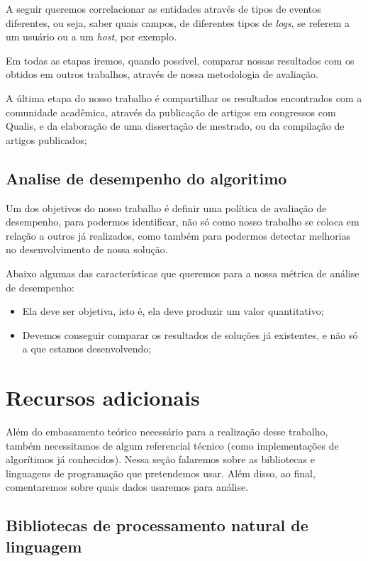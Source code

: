 \documentclass[
	12pt,				%
	openright,			%
	twoside,			%
	a4paper,			%
	english,			%
	spanish,			%
	brazil,				%
	]{abntex2}
\begin{document}
A seguir queremos correlacionar as entidades através de tipos de eventos diferentes, ou seja, saber quais campos, de diferentes tipos de \emph{logs}, se referem a um usuário ou a um \emph{host}, por exemplo.

Em todas as etapas iremos, quando possível, comparar nossas resultados com os obtidos em outros trabalhos, através de nossa metodologia de avaliação.

A última etapa do nosso trabalho é compartilhar os resultados encontrados com a comunidade acadêmica, através da publicação de artigos em congressos com Qualis, e  da elaboração de uma dissertação de mestrado, ou da compilação de artigos publicados;

\subsection{Analise de desempenho do algoritimo}

Um dos objetivos do nosso trabalho é definir uma política de avaliação de desempenho, para podermos identificar, não só como nosso trabalho se coloca em relação a outros já realizados, como também para podermos detectar melhorias no desenvolvimento de nossa solução.

Abaixo algumas das características que queremos para a nossa métrica de análise de desempenho:

\begin{itemize}
	\item Ela deve ser objetiva, isto é, ela deve produzir um valor quantitativo;
	\item Devemos conseguir comparar os resultados de soluções já existentes, e não só a que estamos desenvolvendo;
\end{itemize}

\section{Recursos adicionais}
Além do embasamento teórico necessário para a realização desse trabalho, também necessitamos de algum referencial técnico (como implementações de algorítimos já conhecidos). Nessa seção falaremos sobre as bibliotecas e linguagens de programação que pretendemos usar. Além disso, ao final, comentaremos sobre quais dados usaremos para análise.

\subsection{Bibliotecas de processamento natural de linguagem}
\end{document}
